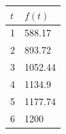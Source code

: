 \documentclass[10pt]{article}
\begin{document}
{{\centering
 \begin{tabular}{| l | l |}
    \hline
    $t$ & $f(t)$\\
    \hline\hline
    1 & 588.17\\
    2 & 893.72\\
    3 & 1052.44\\
    4 & 1134.9\\
    5 & 1177.74\\
    6 & 1200\\
    \hline
    \end{tabular}
    }
}
    \hfill\,
\end{document}
